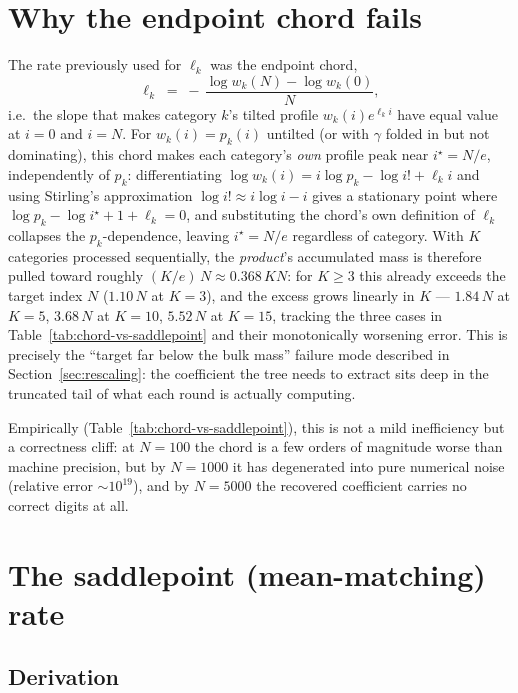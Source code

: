 \documentclass[11pt]{article}
\begin{document}
\section{Why the endpoint chord fails}
\label{sec:chord}

The rate previously used for $\ell_k$ was the endpoint chord,
\[
  \ell_k \;=\; -\,\frac{\log w_k(N) - \log w_k(0)}{N},
\]
i.e.\ the slope that makes category $k$'s tilted profile $w_k(i)e^{\ell_k i}$ have equal
value at $i=0$ and $i=N$. For $w_k(i) = p_k(i)$ untilted (or with $\gamma$ folded in
but not dominating), this chord makes each category's \emph{own} profile peak near
$i^\star = N/e$, independently of $p_k$: differentiating
$\log w_k(i) = i\log p_k - \log i! + \ell_k i$ and using Stirling's approximation
$\log i! \approx i\log i - i$ gives a stationary point where $\log p_k - \log i^\star + 1
+ \ell_k = 0$, and substituting the chord's own definition of $\ell_k$ collapses the
$p_k$-dependence, leaving $i^\star = N/e$ regardless of category. With $K$ categories
processed sequentially, the \emph{product}'s accumulated mass is therefore pulled toward
roughly $(K/e)\,N \approx 0.368\,K N$: for $K\ge 3$ this already exceeds the target index
$N$ ($1.10\,N$ at $K=3$), and the excess grows linearly in $K$ --- $1.84\,N$ at $K=5$,
$3.68\,N$ at $K=10$, $5.52\,N$ at $K=15$, tracking the three cases in
Table~\ref{tab:chord-vs-saddlepoint} and their monotonically worsening error. This is
precisely the ``target far below the bulk mass'' failure mode described in
Section~\ref{sec:rescaling}: the coefficient the tree needs to extract sits deep in the
truncated tail of what each round is actually computing.

Empirically (Table~\ref{tab:chord-vs-saddlepoint}), this is not a mild inefficiency but
a correctness cliff: at $N=100$ the chord is a few orders of magnitude worse than
machine precision, but by $N=1000$ it has degenerated into pure numerical noise
(relative error $\sim 10^{19}$), and by $N=5000$ the recovered coefficient carries no
correct digits at all.

\section{The saddlepoint (mean-matching) rate}
\label{sec:saddlepoint}

\subsection{Derivation}
\end{document}

